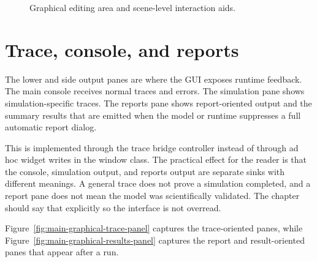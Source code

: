 \begin{figure}[htbp]
\centering
{}
\caption{Graphical editing area and scene-level interaction aids.}
\label{fig:main-graphical-graphics-area}
\end{figure}

\section{Trace, console, and reports}
\label{sec:main-graphical-application-trace}

The lower and side output panes are where the GUI exposes runtime feedback.
The main console receives normal traces and errors. The simulation pane shows
simulation-specific traces. The reports pane shows report-oriented output and
the summary results that are emitted when the model or runtime suppresses a
full automatic report dialog.

This is implemented through the trace bridge controller instead of through
ad hoc widget writes in the window class. The practical effect for the reader
is that the console, simulation output, and reports output are separate sinks
with different meanings. A general trace does not prove a simulation completed,
and a report pane does not mean the model was scientifically validated. The
chapter should say that explicitly so the interface is not overread.

Figure~\ref{fig:main-graphical-trace-panel} captures the trace-oriented panes,
while Figure~\ref{fig:main-graphical-results-panel} captures the report and
result-oriented panes that appear after a run.

